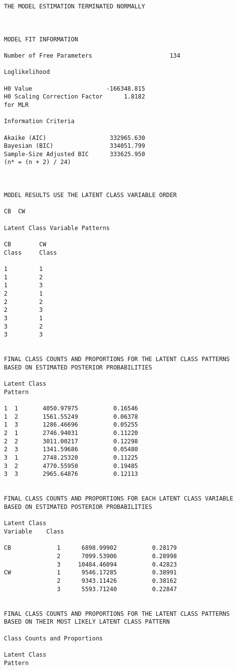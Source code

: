 \begin{verbatim}
THE MODEL ESTIMATION TERMINATED NORMALLY



MODEL FIT INFORMATION

Number of Free Parameters                      134

Loglikelihood

H0 Value                     -166348.815
H0 Scaling Correction Factor      1.8182
for MLR

Information Criteria

Akaike (AIC)                  332965.630
Bayesian (BIC)                334051.799
Sample-Size Adjusted BIC      333625.950
(n* = (n + 2) / 24)



MODEL RESULTS USE THE LATENT CLASS VARIABLE ORDER

CB  CW

Latent Class Variable Patterns

CB        CW
Class     Class

1         1
1         2
1         3
2         1
2         2
2         3
3         1
3         2
3         3


FINAL CLASS COUNTS AND PROPORTIONS FOR THE LATENT CLASS PATTERNS
BASED ON ESTIMATED POSTERIOR PROBABILITIES

Latent Class
Pattern

1  1       4050.97975          0.16546
1  2       1561.55249          0.06378
1  3       1286.46696          0.05255
2  1       2746.94031          0.11220
2  2       3011.00217          0.12298
2  3       1341.59686          0.05480
3  1       2748.25320          0.11225
3  2       4770.55950          0.19485
3  3       2965.64876          0.12113


FINAL CLASS COUNTS AND PROPORTIONS FOR EACH LATENT CLASS VARIABLE
BASED ON ESTIMATED POSTERIOR PROBABILITIES

Latent Class
Variable    Class

CB             1      6898.99902          0.28179
               2      7099.53906          0.28998
               3     10484.46094          0.42823
CW             1      9546.17285          0.38991
               2      9343.11426          0.38162
               3      5593.71240          0.22847


FINAL CLASS COUNTS AND PROPORTIONS FOR THE LATENT CLASS PATTERNS
BASED ON THEIR MOST LIKELY LATENT CLASS PATTERN

Class Counts and Proportions

Latent Class
Pattern


\end{verbatim}
